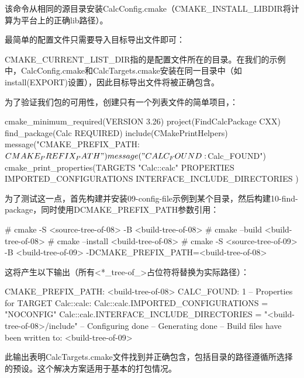 该命令从相同的源目录安装CalcConfig.cmake（CMAKE\_INSTALL\_LIBDIR将计算为平台上的正确lib路径）。

最简单的配置文件只需要导入目标导出文件即可：



CMAKE\_CURRENT\_LIST\_DIR指的是配置文件所在的目录。在我们的示例中，CalcConfig.cmake和CalcTargets.cmake安装在同一目录中（如install(EXPORT)设置），因此目标导出文件将被正确包含。

为了验证我们包的可用性，创建只有一个列表文件的简单项目，：


\begin{cmake}
cmake_minimum_required(VERSION 3.26)
project(FindCalcPackage CXX)
find_package(Calc REQUIRED)
include(CMakePrintHelpers)
message("CMAKE_PREFIX_PATH: ${CMAKE_PREFIX_PATH}")
message("CALC_FOUND: ${Calc_FOUND}")
cmake_print_properties(TARGETS "Calc::calc" PROPERTIES
    IMPORTED_CONFIGURATIONS
    INTERFACE_INCLUDE_DIRECTORIES
)
\end{cmake}

为了测试这一点，首先构建并安装09-config-file示例到某个目录，然后构建10-find-package，同时使用DCMAKE\_PREFIX\_PATH参数引用：

\begin{shell}
# cmake -S <source-tree-of-08> -B <build-tree-of-08>
# cmake --build <build-tree-of-08>
# cmake --install <build-tree-of-08>
# cmake -S <source-tree-of-09> -B <build-tree-of-09>
        -DCMAKE_PREFIX_PATH=<build-tree-of-08>
\end{shell}

这将产生以下输出（所有<*\_tree-of\_>占位符将替换为实际路径）：

\begin{shell}
CMAKE_PREFIX_PATH: <build-tree-of-08>
CALC_FOUND: 1
--
Properties for TARGET Calc::calc:
   Calc::calc.IMPORTED_CONFIGURATIONS = "NOCONFIG"
   Calc::calc.INTERFACE_INCLUDE_DIRECTORIES = "<build-tree-of-08>/include"
-- Configuring done
-- Generating done
-- Build files have been written to: <build-tree-of-09>
\end{shell}

此输出表明CalcTargets.cmake文件找到并正确包含，包括目录的路径遵循所选择的预设。这个解决方案适用于基本的打包情况。

